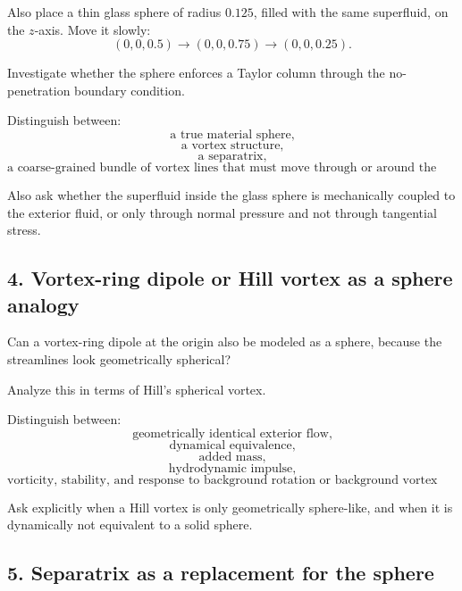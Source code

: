 \documentclass[11pt]{article}
\begin{document}
            Also place a thin glass sphere of radius \(0.125\), filled with the same superfluid, on the \(z\)-axis. Move it slowly:
            \[
                (0,0,0.5)
                \rightarrow
                (0,0,0.75)
                \rightarrow
                (0,0,0.25).
            \]
            
            Investigate whether the sphere enforces a Taylor column through the no-penetration boundary condition.
            
            Distinguish between:
            \[
                \text{a true material sphere,}
            \]
            \[
                \text{a vortex structure,}
            \]
            \[
                \text{a separatrix,}
            \]
            \[
                \text{a coarse-grained bundle of vortex lines that must move through or around the sphere.}
            \]
            
            Also ask whether the superfluid inside the glass sphere is mechanically coupled to the exterior fluid, or only through normal pressure and not through tangential stress.
        
        \subsection{4. Vortex-ring dipole or Hill vortex as a sphere analogy}
            
            Can a vortex-ring dipole at the origin also be modeled as a sphere, because the streamlines look geometrically spherical?
            
            Analyze this in terms of Hill's spherical vortex.
            
            Distinguish between:
            \[
                \text{geometrically identical exterior flow,}
            \]
            \[
                \text{dynamical equivalence,}
            \]
            \[
                \text{added mass,}
            \]
            \[
                \text{hydrodynamic impulse,}
            \]
            \[
                \text{vorticity, stability, and response to background rotation or background vortex lines.}
            \]
            
            Ask explicitly when a Hill vortex is only geometrically sphere-like, and when it is dynamically not equivalent to a solid sphere.
        
        \subsection{5. Separatrix as a replacement for the sphere}
            
\end{document}
